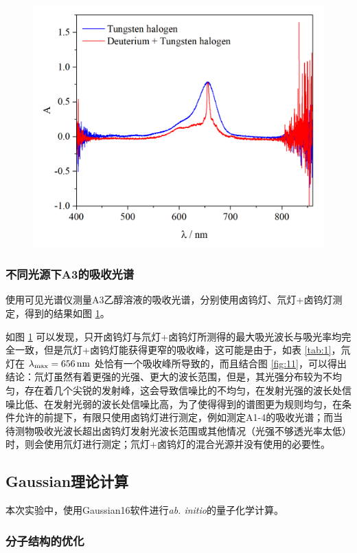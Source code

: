 \begin{figure}[H]
    \centering
    \includegraphics[width=.6\textwidth]{figures2/2-9.png}
    \label{fig:12}
\end{figure}


\subsubsection{不同光源下A3的吸收光谱}

使用可见光谱仪测量A3乙醇溶液的吸收光谱，分别使用卤钨灯、氘灯+卤钨灯测定，得到的结果如图 \ref{fig:12}。

如图 \ref{fig:12} 可以发现，只开卤钨灯与氘灯+卤钨灯所测得的最大吸光波长与吸光率均完全一致，但是氘灯+卤钨灯能获得更窄的吸收峰，这可能是由于，如表 \ref{tab:1}，氘灯在 $\lambda_{\rm max} = \SI{656}{nm}$ 处恰有一个吸收峰所导致的，而且结合图 \ref{fig:11}，可以得出结论：氘灯虽然有着更强的光强、更大的波长范围，但是，其光强分布较为不均匀，存在着几个尖锐的发射峰，这会导致信噪比的不均匀，在发射光强的波长处信噪比低、在发射光弱的波长处信噪比高，为了使得得到的谱图更为规则均匀，在条件允许的前提下，有限只使用卤钨灯进行测定，例如测定A1-4的吸收光谱；而当待测物吸收光波长超出卤钨灯发射光波长范围或其他情况（光强不够透光率太低）时，则会使用氘灯进行测定；氘灯+卤钨灯的混合光源并没有使用的必要性。

\subsection{Gaussian理论计算}

本次实验中，使用Gaussian16软件进行\textit{ab. initio}的量子化学计算。

\subsubsection{分子结构的优化}

